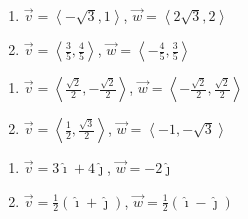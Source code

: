 \begin{multicols}{2}

\begin{enumerate}

\setcounter{enumi}{\value{HW}}

\item $\vec{v} = \left<-\sqrt{3}, 1\right>$, $\vec{w} = \left<2\sqrt{3}, 2\right>$
\item  $\vec{v} = \left<\frac{3}{5}, \frac{4}{5}\right>$, $\vec{w} = \left<-\frac{4}{5}, \frac{3}{5}\right>$

\setcounter{HW}{\value{enumi}}

\end{enumerate}

\end{multicols}

\begin{multicols}{2}

\begin{enumerate}

\setcounter{enumi}{\value{HW}}

\item $\vec{v} = \left<\frac{\sqrt{2}}{2}, -\frac{\sqrt{2}}{2}\right>$, $\vec{w} = \left<-\frac{\sqrt{2}}{2}, \frac{\sqrt{2}}{2} \right>$
\item $\vec{v} = \left<\frac{1}{2}, \frac{\sqrt{3}}{2}  \right>$, $\vec{w} =  \left< -1, -\sqrt{3} \right>$

\setcounter{HW}{\value{enumi}}

\end{enumerate}

\end{multicols}

\begin{multicols}{2}

\begin{enumerate}

\setcounter{enumi}{\value{HW}}

\item $\vec{v} = 3\hat{\imath} + 4\hat{\jmath}$, $\vec{w} = -2\hat{\jmath}$
\item $\vec{v} =\frac{1}{2} \left(\hat{\imath} + \hat{\jmath}\right)$, $\vec{w} = \frac{1}{2} \left(\hat{\imath} - \hat{\jmath}\right)$ \label{vectorbasiclast}

\setcounter{HW}{\value{enumi}}

\end{enumerate}

\end{multicols}

